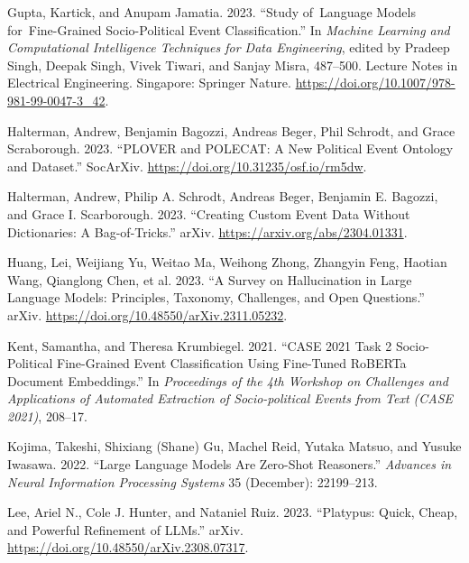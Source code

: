 \documentclass[
  letterpaper,
  DIV=11,
  numbers=noendperiod]{scrartcl}
\newlength{\cslhangindent}
\newlength{\cslentryspacingunit} %
\newenvironment{CSLReferences}[2] %
 {%
  \setlength{\parindent}{0pt}
  \ifodd #1
  \let\oldpar\par
  \def\par{\hangindent=\cslhangindent\oldpar}
  \fi
  \setlength{\parskip}{#2\cslentryspacingunit}
 }%
 {}
\begin{document}
\begin{CSLReferences}{1}{0}
\leavevmode{}%
Gupta, Kartick, and Anupam Jamatia. 2023. {``Study of~{Language Models}
for~{Fine-Grained Socio-Political Event Classification}.''} In
\emph{Machine {Learning} and {Computational Intelligence Techniques} for
{Data Engineering}}, edited by Pradeep Singh, Deepak Singh, Vivek
Tiwari, and Sanjay Misra, 487--500. Lecture {Notes} in {Electrical
Engineering}. {Singapore}: {Springer Nature}.
\url{https://doi.org/10.1007/978-981-99-0047-3_42}.

\leavevmode{}%
Halterman, Andrew, Benjamin Bagozzi, Andreas Beger, Phil Schrodt, and
Grace Scraborough. 2023. {``{PLOVER} and {POLECAT}: {A New Political
Event Ontology} and {Dataset}.''} {SocArXiv}.
\url{https://doi.org/10.31235/osf.io/rm5dw}.

\leavevmode{}%
Halterman, Andrew, Philip A. Schrodt, Andreas Beger, Benjamin E.
Bagozzi, and Grace I. Scarborough. 2023. {``Creating {Custom Event Data
Without Dictionaries}: {A Bag-of-Tricks}.''} {arXiv}.
\url{https://arxiv.org/abs/2304.01331}.

\leavevmode{}%
Huang, Lei, Weijiang Yu, Weitao Ma, Weihong Zhong, Zhangyin Feng,
Haotian Wang, Qianglong Chen, et al. 2023. {``A {Survey} on
{Hallucination} in {Large Language Models}: {Principles}, {Taxonomy},
{Challenges}, and {Open Questions}.''} {arXiv}.
\url{https://doi.org/10.48550/arXiv.2311.05232}.

\leavevmode{}%
Kent, Samantha, and Theresa Krumbiegel. 2021. {``{CASE} 2021 Task 2
Socio-Political Fine-Grained Event Classification Using Fine-Tuned
{RoBERTa} Document Embeddings.''} In \emph{Proceedings of the 4th
{Workshop} on {Challenges} and {Applications} of {Automated Extraction}
of {Socio-political Events} from {Text} ({CASE} 2021)}, 208--17.

\leavevmode{}%
Kojima, Takeshi, Shixiang (Shane) Gu, Machel Reid, Yutaka Matsuo, and
Yusuke Iwasawa. 2022. {``Large {Language Models} Are {Zero-Shot
Reasoners}.''} \emph{Advances in Neural Information Processing Systems}
35 (December): 22199--213.

\leavevmode{}%
Lee, Ariel N., Cole J. Hunter, and Nataniel Ruiz. 2023. {``Platypus:
{Quick}, {Cheap}, and {Powerful Refinement} of {LLMs}.''} {arXiv}.
\url{https://doi.org/10.48550/arXiv.2308.07317}.


\end{CSLReferences}
\end{document}
